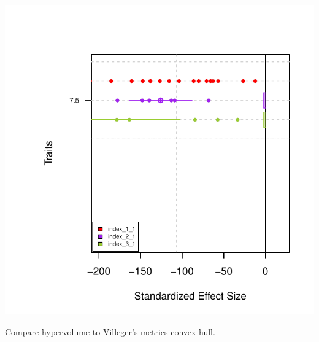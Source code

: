 \documentclass[12pt]{article}\usepackage[]{graphicx}\usepackage[]{color}
\makeatletter
\def\maxwidth{ %
  \ifdim\Gin@nat@width>\linewidth
    \linewidth
  \else
    \Gin@nat@width
  \fi
}
\newenvironment{knitrout}{}{} %
\makeatother
\begin{document}
\begin{knitrout}
{\centering \includegraphics[width=\maxwidth]{figure/unnamed-chunk-60-2} 

}



\end{knitrout}

Compare hypervolume to Villeger's metrics convex hull.
\end{document}
